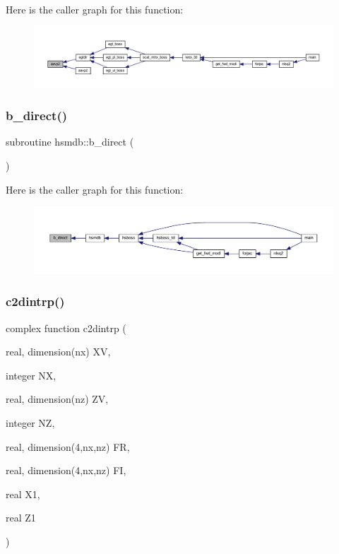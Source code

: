 Here is the caller graph for this function\+:\nopagebreak
\begin{figure}[H]
\begin{center}
\leavevmode
\includegraphics[width=350pt]{Leroi_8f90_afeabf8ee47c9628f00ed2dfa98f56e40_icgraph}
\end{center}
\end{figure}
\mbox{\label{Leroi_8f90_a485defa6db785c79bb6a092cd797ca0e}} 
\subsubsection{\texorpdfstring{b\+\_\+direct()}{b\_direct()}}
{\footnotesize\ttfamily subroutine hsmdb\+::b\+\_\+direct (\begin{DoxyParamCaption}{ }\end{DoxyParamCaption})}

Here is the caller graph for this function\+:\nopagebreak
\begin{figure}[H]
\begin{center}
\leavevmode
\includegraphics[width=350pt]{Leroi_8f90_a485defa6db785c79bb6a092cd797ca0e_icgraph}
\end{center}
\end{figure}
\mbox{\label{Leroi_8f90_ab444c66af8ac23d415864bbbd3ff9872}} 
\subsubsection{\texorpdfstring{c2dintrp()}{c2dintrp()}}
{\footnotesize\ttfamily complex function c2dintrp (\begin{DoxyParamCaption}\item[{real, dimension(nx)}]{XV,  }\item[{integer}]{NX,  }\item[{real, dimension(nz)}]{ZV,  }\item[{integer}]{NZ,  }\item[{real, dimension(4,nx,nz)}]{FR,  }\item[{real, dimension(4,nx,nz)}]{FI,  }\item[{real}]{X1,  }\item[{real}]{Z1 }\end{DoxyParamCaption})}

